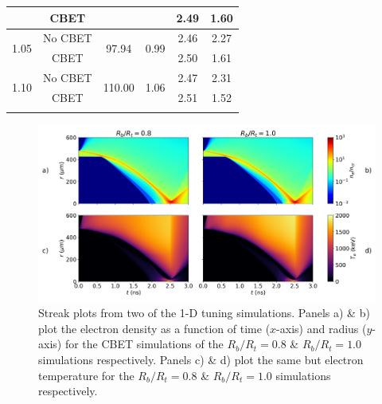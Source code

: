 \begin{table}[]
\begin{tabular}{cccccc}
                          & CBET    &                                                                                    &                                                                         & 2.49                                                                      & 1.60                                 \\ \hline
    \multirow{2}{*}{1.05} & No CBET & \multirow{2}{*}{97.94}                                                             & \multirow{2}{*}{0.99}                                                   & 2.46                                                                      & 2.27                                 \\
                          & CBET    &                                                                                    &                                                                         & 2.50                                                                      & 1.61                                 \\ \hline
    \multirow{2}{*}{1.10} & No CBET & \multirow{2}{*}{110.00}                                                            & \multirow{2}{*}{1.06}                                                   & 2.47                                                                      & 2.31                                 \\
                          & CBET    &                                                                                    &                                                                         & 2.51                                                                      & 1.52                                 \\ \hhline{======}
    \end{tabular}
    \label{tab:res1_1d_tuning}
\end{table}
\egroup

\begin{figure}[t!]
    \includegraphics[width=\linewidth]{Results1/Images/streaks.png}
    \centering
    \caption{Streak plots from two of the 1-D tuning simulations.
    Panels a) \& b) plot the electron density as a function of time ($x$-axis) and radius ($y$-axis) for the \ac{CBET} simulations of the $R_b/R_t=0.8$ \& $R_b/R_t=1.0$ simulations respectively.
    Panels c) \& d) plot the same but electron temperature for the $R_b/R_t=0.8$ \& $R_b/R_t=1.0$ simulations respectively.}%
    \label{fig:Res1_streaks}
\end{figure}


